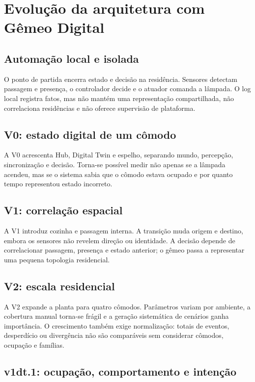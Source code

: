 \documentclass[10pt,a4paper]{article}
\begin{document}
\section{Evolução da arquitetura com Gêmeo Digital}

\subsection{Automação local e isolada}

O ponto de partida encerra estado e decisão na residência. Sensores detectam passagem e presença, o controlador decide e o atuador comanda a lâmpada. O log local registra fatos, mas não mantém uma representação compartilhada, não correlaciona residências e não oferece supervisão de plataforma.

\subsection{V0: estado digital de um cômodo}

A V0 acrescenta Hub, Digital Twin e espelho, separando mundo, percepção, sincronização e decisão. Torna-se possível medir não apenas se a lâmpada acendeu, mas se o sistema sabia que o cômodo estava ocupado e por quanto tempo representou estado incorreto.

\subsection{V1: correlação espacial}

A V1 introduz cozinha e passagem interna. A transição muda origem e destino, embora os sensores não revelem direção ou identidade. A decisão depende de correlacionar passagem, presença e estado anterior; o gêmeo passa a representar uma pequena topologia residencial.

\subsection{V2: escala residencial}

A V2 expande a planta para quatro cômodos. Parâmetros variam por ambiente, a cobertura manual torna-se frágil e a geração sistemática de cenários ganha importância. O crescimento também exige normalização: totais de eventos, desperdício ou divergência não são comparáveis sem considerar cômodos, ocupação e famílias.

\subsection{v1dt.1: ocupação, comportamento e intenção}
\end{document}
